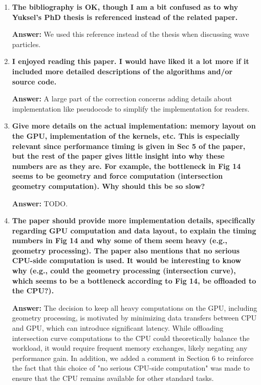 \documentclass{article}
\newcommand{\answer}[1]{\textbf{\textcolor{answercolor}{Answer:}} \textcolor{answercolor}{#1}}
\begin{document}
\begin{enumerate}[label=\textbf{\arabic*.}]
    \item \textbf{The bibliography is OK, though I am a bit confused as to why Yuksel's PhD thesis is referenced instead of the related paper.}
    
    \answer{We used this reference instead of the thesis when discussing wave particles.}

    \item \textbf{I enjoyed reading this paper. I would have liked it a lot more if it included more detailed descriptions of the algorithms and/or source code.}
    
    \answer{A large part of the correction concerns adding details about implementation like pseudocode to simplify the implementation for readers.}

    \item \textbf{Give more details on the actual implementation: memory layout on the GPU, implementation of the kernels, etc. This is especially relevant since performance timing is given in Sec 5 of the paper, but the rest of the paper gives little insight into why these numbers are as they are. For example, the bottleneck in Fig 14 seems to be geometry and force computation (intersection geometry computation). Why should this be so slow?}
    
    \answer{TODO.}

    \item \textbf{The paper should provide more implementation details, specifically regarding GPU computation and data layout, to explain the timing numbers in Fig 14 and why some of them seem heavy (e.g., geometry processing). The paper also mentions that no serious CPU-side computation is used. It would be interesting to know why (e.g., could the geometry processing (intersection curve), which seems to be a bottleneck according to Fig 14, be offloaded to the CPU?).}
    
    \answer{The decision to keep all heavy computations on the GPU, including geometry processing, is motivated by minimizing data transfers between CPU and GPU, which can introduce significant latency. While offloading intersection curve computations to the CPU could theoretically balance the workload, it would require frequent memory exchanges, likely negating any performance gain. In addition, we added a comment in Section 6 to reinforce the fact that this choice of "no serious CPU-side computation" was made to ensure that the CPU remains available for other standard tasks.}


\end{enumerate}
\end{document}
